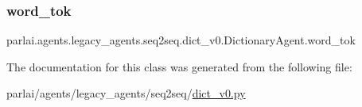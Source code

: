 \subsubsection{\texorpdfstring{word\+\_\+tok}{word\_tok}}
{\footnotesize\ttfamily parlai.\+agents.\+legacy\+\_\+agents.\+seq2seq.\+dict\+\_\+v0.\+Dictionary\+Agent.\+word\+\_\+tok}



The documentation for this class was generated from the following file\+:\begin{DoxyCompactItemize}
\item 
parlai/agents/legacy\+\_\+agents/seq2seq/\hyperlink{dict__v0_8py}{dict\+\_\+v0.\+py}\end{DoxyCompactItemize}
